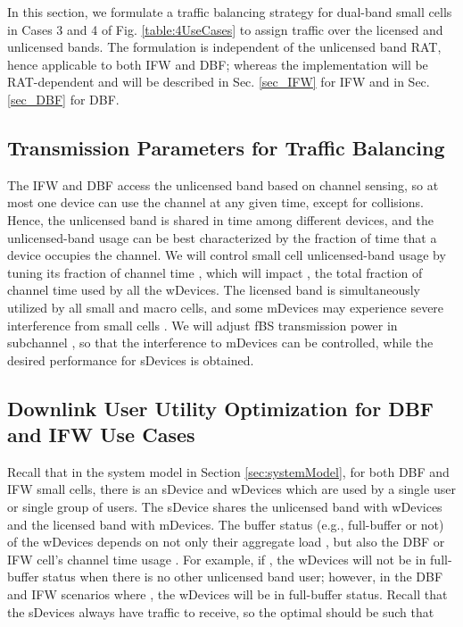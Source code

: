 \documentclass[journal,final,letterpaper,10pt,doublecolumn,twoside]{IEEEtran}
\begin{document}
In this section, we formulate a traffic balancing strategy for dual-band small cells in Cases 3 and 4 of Fig. \ref{table:4UseCases} to assign traffic over the licensed and unlicensed bands. The formulation is independent of the unlicensed band RAT, hence applicable to both IFW and DBF; whereas the implementation will be RAT-dependent and will be described in Sec. \ref{sec_IFW} for IFW and in Sec. \ref{sec_DBF} for DBF.

\subsection{Transmission Parameters for Traffic Balancing}\label{subsec:Parameters-To-Optimize}

The IFW and DBF access the unlicensed band based on channel sensing,
so at most one device can use the channel at any given time, except
for collisions. Hence, the unlicensed band is shared in time among
different devices, and the unlicensed-band usage can be best
characterized by the fraction of time that a device occupies the
channel. We will control  small cell unlicensed-band usage by
tuning its fraction of channel time , which will impact ,
the total fraction of channel time used by all the wDevices. The licensed
band is simultaneously utilized by all small and macro cells, and
some mDevices may experience severe interference from small cells
\cite{femto-PowerControl-2010Sundeep}. We will adjust fBS
transmission power  in subchannel , so that the
interference to mDevices can be controlled, while the desired
performance for sDevices is obtained.



\subsection{Downlink User Utility Optimization for DBF and IFW Use Cases}\label{sec:user utility opt}


Recall that in the system model in Section \ref{sec:systemModel},
for both DBF and IFW small cells, there is an sDevice and  wDevices which are used by a single user or single group of users. The sDevice shares the unlicensed band with  wDevices and the licensed band with  mDevices.
The buffer status (e.g., full-buffer or not) of the wDevices depends on not only their aggregate load , but also the DBF or IFW cell's channel time usage .   For example, if , the wDevices will not be in full-buffer status when there is no other unlicensed band user; however, in the DBF and IFW scenarios where ,  the wDevices will be in full-buffer status. Recall that the sDevices  always have traffic to receive, so the optimal  should be such that
\end{document}
